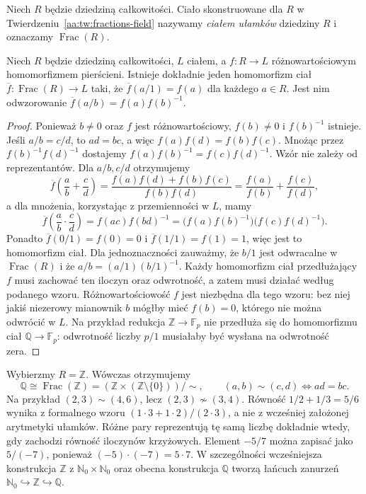 \begin{definicja}
\label{aa:def:field-of-fractions}
Niech $R$ będzie dziedziną całkowitości.
Ciało skonstruowane dla $R$ w
Twierdzeniu~\ref{aa:tw:fractions-field} nazywamy
\emph{ciałem ułamków} dziedziny $R$ i oznaczamy
$\operatorname{Frac}(R)$.
\end{definicja}

\begin{twierdzenie}
\label{aa:tw:fractions-universal}
Niech $R$ będzie dziedziną całkowitości, $L$ ciałem,
a $f:R\to L$ różnowartościowym homomorfizmem pierścieni.
Istnieje dokładnie jeden homomorfizm ciał
$\overline f:\operatorname{Frac}(R)\to L$ taki, że
$\overline f(a/1)=f(a)$ dla każdego $a\in R$.
Jest nim odwzorowanie $\overline f(a/b)=f(a)f(b)^{-1}$.
\end{twierdzenie}
\begin{proof}
Ponieważ $b\ne0$ oraz $f$ jest różnowartościowy,
$f(b)\ne0$ i $f(b)^{-1}$ istnieje. Jeśli $a/b=c/d$,
to $ad=bc$, a więc $f(a)f(d)=f(b)f(c)$.
Mnożąc przez $f(b)^{-1}f(d)^{-1}$ dostajemy
$f(a)f(b)^{-1}=f(c)f(d)^{-1}$. Wzór nie zależy
od reprezentantów. Dla $a/b,c/d$ otrzymujemy
\[
\overline f\left(\frac ab+\frac cd\right)
=\frac{f(a)f(d)+f(b)f(c)}{f(b)f(d)}
=\frac{f(a)}{f(b)}+\frac{f(c)}{f(d)},
\]
a dla mnożenia, korzystając z przemienności w $L$,
mamy
\[
\overline f\left(\frac ab\cdot\frac cd\right)
=f(ac)f(bd)^{-1}
=\bigl(f(a)f(b)^{-1}\bigr)
 \bigl(f(c)f(d)^{-1}\bigr).
\]
Ponadto $\overline f(0/1)=f(0)=0$ i
$\overline f(1/1)=f(1)=1$, więc jest to homomorfizm ciał.
Dla jednoznaczności zauważmy, że $b/1$ jest odwracalne
w $\operatorname{Frac}(R)$ i że
$a/b=(a/1)(b/1)^{-1}$. Każdy homomorfizm ciał
przedłużający $f$ musi zachować ten iloczyn oraz odwrotność,
a zatem musi działać według podanego wzoru.
Różnowartościowość $f$ jest niezbędna dla tego wzoru:
bez niej jakiś niezerowy mianownik $b$ mógłby mieć
$f(b)=0$, którego nie można odwrócić w $L$.
Na przykład redukcja $\mathbb Z\to\mathbb F_p$
nie przedłuża się do homomorfizmu ciał
$\mathbb Q\to\mathbb F_p$: odwrotność liczby
$p/1$ musiałaby być wysłana na odwrotność zera.
\end{proof}

\begin{przyklad}
\label{aa:prz:construct-rationals}
Wybierzmy $R=\mathbb Z$. Wówczas otrzymujemy
\[
\mathbb Q\cong\operatorname{Frac}(\mathbb Z)
=(\mathbb Z\times(\mathbb Z\setminus\{0\}))/\!\sim,
\qquad (a,b)\sim(c,d)\iff ad=bc.
\]
Na przykład $(2,3)\sim(4,6)$, lecz $(2,3)\not\sim(3,4)$.
Równość $1/2+1/3=5/6$ wynika z formalnego wzoru
$(1\cdot3+1\cdot2)/(2\cdot3)$, a nie z wcześniej
założonej arytmetyki ułamków. Różne pary reprezentują tę
samą liczbę dokładnie wtedy, gdy zachodzi równość
iloczynów krzyżowych. Element $-5/7$ można zapisać
jako $5/(-7)$, ponieważ $(-5)\cdot(-7)=5\cdot7$.
W szczególności wcześniejsza konstrukcja $\mathbb Z$
z $\mathbb N_0\times\mathbb N_0$ oraz obecna konstrukcja
$\mathbb Q$ tworzą łańcuch zanurzeń
$\mathbb N_0\hookrightarrow\mathbb Z\hookrightarrow\mathbb Q$.
\end{przyklad}

